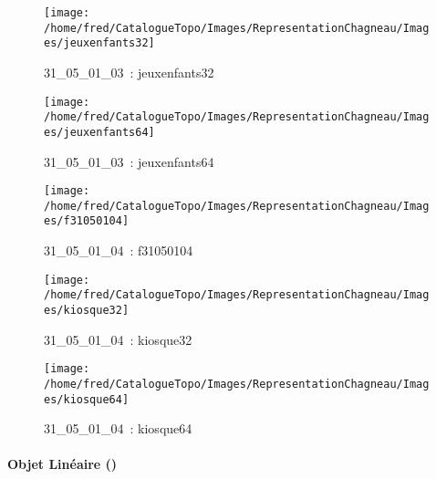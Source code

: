 \documentclass[12pt,titlepage]{book}
\begin{document}
\begin{figure}[h!]
\begin{minipage}[t]{3cm}
    \begin{center}
      \texttt{[image: /home/fred/CatalogueTopo/Images/RepresentationChagneau/Images/jeuxenfants32]}
      \caption[~31\_05\_01\_03]{\small{31\_05\_01\_03~:} \tiny{jeuxenfants32}}\label{jeuxenfants32}
    \end{center}
  \end{minipage}
  \begin{minipage}[t]{3cm}
    \begin{center}
      \texttt{[image: /home/fred/CatalogueTopo/Images/RepresentationChagneau/Images/jeuxenfants64]}
      \caption[~31\_05\_01\_03]{\small{31\_05\_01\_03~:} \tiny{jeuxenfants64}}\label{jeuxenfants64}
    \end{center}
  \end{minipage}
  \begin{minipage}[t]{3cm}
    \begin{center}
      \texttt{[image: /home/fred/CatalogueTopo/Images/RepresentationChagneau/Images/f31050104]}
      \caption[~31\_05\_01\_04]{\small{31\_05\_01\_04~:} \tiny{f31050104}}\label{f31050104}
    \end{center}
  \end{minipage}
  \begin{minipage}[t]{3cm}
    \begin{center}
      \texttt{[image: /home/fred/CatalogueTopo/Images/RepresentationChagneau/Images/kiosque32]}
      \caption[~31\_05\_01\_04]{\small{31\_05\_01\_04~:} \tiny{kiosque32}}\label{kiosque32}
    \end{center}
  \end{minipage}
  \begin{minipage}[t]{3cm}
    \begin{center}
      \texttt{[image: /home/fred/CatalogueTopo/Images/RepresentationChagneau/Images/kiosque64]}
      \caption[~31\_05\_01\_04]{\small{31\_05\_01\_04~:} \tiny{kiosque64}}\label{kiosque64}
    \end{center}
  \end{minipage}
\end{figure}


\paragraph{Objet Linéaire ()}
\noindent
\vspace{\baselineskip}
\end{document}
